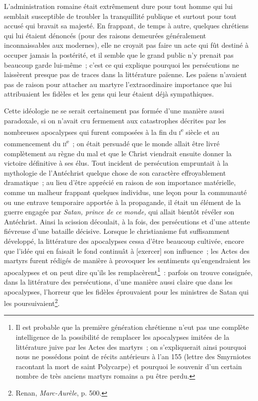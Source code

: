 \documentclass[french,twoside]{book} %
\newcommand\corr[1]{#1}
\begin{document}
L’administration romaine était extrêmement dure pour tout homme qui lui semblait susceptible de troubler la tranquillité publique et surtout pour tout accusé qui bravait sa majesté. En frappant, de temps à autre, quelques chrétiens qui lui étaient dénoncés (pour des raisons demeurées généralement inconnaissables aux modernes),  elle ne croyait pas faire un acte qui fût destiné à occuper jamais la postérité, et il semble que le grand public n’y prenait pas beaucoup garde lui-même ; c’est ce qui explique pourquoi les persécutions ne laissèrent presque pas de traces dans la littérature païenne. Les païens n’avaient pas de raison pour attacher au martyre l’extraordinaire importance que lui attribuaient les fidèles et les gens qui leur étaient déjà sympathiques.\par
Cette idéologie ne se serait certainement pas formée d’une manière aussi paradoxale, si on n’avait cru fermement aux catastrophes décrites par les nombreuses apocalypses qui furent composées à la fin du {\scshape i}\textsuperscript{e} siècle et au commencement du {\scshape ii}\textsuperscript{e} ; on était persuadé que le monde allait être livré complètement au règne du mal et que le Christ viendrait ensuite donner la victoire définitive à ses élus. Tout incident de persécution empruntait à la mythologie de l’Antéchrist quelque chose de son caractère effroyablement dramatique ; au lieu d’être apprécié en raison de son importance matérielle, comme un malheur frappant quelques individus, une leçon pour la communauté ou une entrave temporaire apportée à la propagande, il était un élément de la guerre engagée par \emph{Satan, prince de ce monde,} qui allait bientôt révéler son Antéchrist. Ainsi la scission découlait, à la fois, des persécutions et d’une attente fiévreuse d’une bataille décisive. Lorsque le christianisme fut suffisamment développé, la littérature des apocalypses cessa d’être beaucoup cultivée, encore que l’idée qui en faisait le fond continuât à [{\corr exercer}] son influence ; les Actes des martyrs furent rédigés de manière à provoquer les sentiments qu’engendraient les apocalypses et on peut dire  qu’ils les remplacèrent\footnote{ \noindent Il est probable que la première génération chrétienne n’eut pas une complète intelligence de la possibilité de remplacer les apocalypses imitées de la littérature juive par les Actes des martyrs ; on s’expliquerait ainsi pourquoi nous ne possédons point de récits antérieurs à l’an 155 (lettre des Smyrniotes racontant la mort de saint Polycarpe) et pourquoi le souvenir d’un certain nombre de très anciens martyrs romains a pu être perdu.
 } : parfois on trouve consignée, dans la littérature des persécutions, d’une manière aussi claire que dans les apocalypses, l’horreur que les fidèles éprouvaient pour les ministres de Satan qui les poursuivaient\footnote{ \noindent Renan, \emph{Marc-Aurèle}, p. 500.
 }.\par
\end{document}
